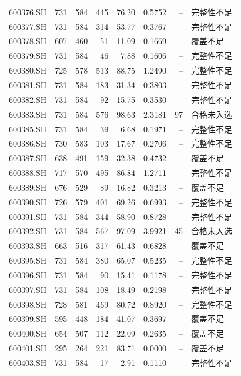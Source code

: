 \documentclass[10pt,a4paper]{article}
\begin{document}
\begin{longtable}{lrrr r r r l}
600376.SH & 731 & 584 & 445 & 76.20 & 0.5752 & -- & 完整性不足\\
600377.SH & 731 & 584 & 314 & 53.77 & 0.3767 & -- & 完整性不足\\
600378.SH & 607 & 460 & 51 & 11.09 & 0.1669 & -- & 覆盖不足\\
600379.SH & 731 & 584 & 46 & 7.88 & 0.1606 & -- & 完整性不足\\
600380.SH & 725 & 578 & 513 & 88.75 & 1.2490 & -- & 完整性不足\\
600381.SH & 731 & 584 & 183 & 31.34 & 0.3803 & -- & 完整性不足\\
600382.SH & 731 & 584 & 92 & 15.75 & 0.3530 & -- & 完整性不足\\
600383.SH & 731 & 584 & 576 & 98.63 & 2.3181 & 97 & 合格未入选\\
600385.SH & 731 & 584 & 39 & 6.68 & 0.1971 & -- & 完整性不足\\
600386.SH & 730 & 583 & 103 & 17.67 & 0.2706 & -- & 完整性不足\\
600387.SH & 638 & 491 & 159 & 32.38 & 0.4732 & -- & 覆盖不足\\
600388.SH & 717 & 570 & 495 & 86.84 & 1.2711 & -- & 完整性不足\\
600389.SH & 676 & 529 & 89 & 16.82 & 0.3213 & -- & 覆盖不足\\
600390.SH & 726 & 579 & 401 & 69.26 & 0.6993 & -- & 完整性不足\\
600391.SH & 731 & 584 & 344 & 58.90 & 0.8728 & -- & 完整性不足\\
600392.SH & 731 & 584 & 567 & 97.09 & 3.9921 & 45 & 合格未入选\\
600393.SH & 663 & 516 & 317 & 61.43 & 0.6828 & -- & 覆盖不足\\
600395.SH & 731 & 584 & 380 & 65.07 & 0.5235 & -- & 完整性不足\\
600396.SH & 731 & 584 & 90 & 15.41 & 0.1178 & -- & 完整性不足\\
600397.SH & 731 & 584 & 108 & 18.49 & 0.2198 & -- & 完整性不足\\
600398.SH & 728 & 581 & 469 & 80.72 & 0.8920 & -- & 完整性不足\\
600399.SH & 595 & 448 & 184 & 41.07 & 0.3697 & -- & 覆盖不足\\
600400.SH & 654 & 507 & 112 & 22.09 & 0.2635 & -- & 覆盖不足\\
600401.SH & 295 & 264 & 221 & 83.71 & 0.0000 & -- & 覆盖不足\\
600403.SH & 731 & 584 & 17 & 2.91 & 0.1110 & -- & 完整性不足\\

\end{longtable}
\end{document}
